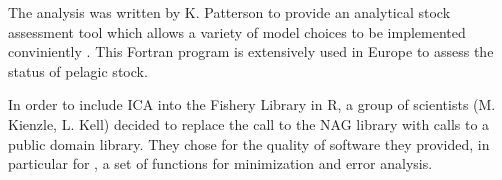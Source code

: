 The  analysis was written by K. Patterson to provide an analytical stock assessment tool which allows a variety of model choices to be implemented conviniently \citep{pat96a}. This Fortran program is extensively used in Europe to assess the status of pelagic stock.


In order to include ICA into the Fishery Library in R, a group of scientists (M. Kienzle, L. Kell) decided to replace the call to the NAG library with calls to a public domain library. They chose  for the quality of software they provided, in particular for , a set of functions for minimization and error analysis.
